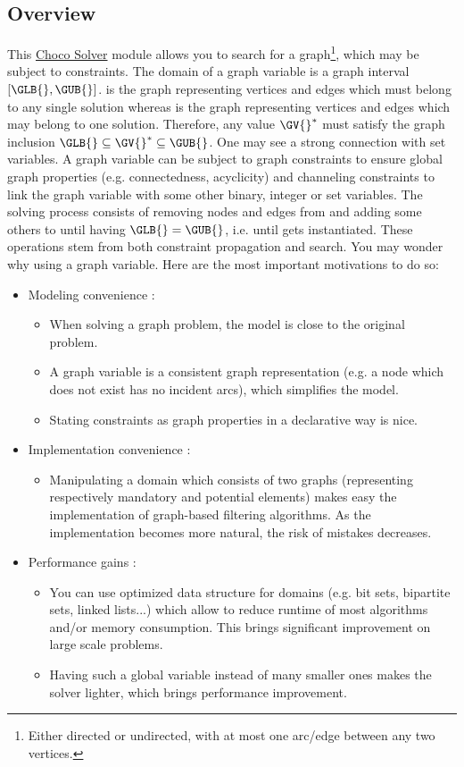 \documentclass{article}
\begin{document}
\subsection{Overview}

This \href{http://www.choco-solver.org/}{Choco Solver} module allows you to search for a graph\footnote{Either directed or undirected, with at most one arc/edge between any two vertices. }, which may be subject to constraints. 
%
The domain of a graph variable \GV{} is a graph interval $[\GLB{},\GUB{}]$. \GLB{} is the graph representing vertices and edges which must belong to any single solution whereas \GUB{} is the graph representing vertices and edges which may belong to one solution. Therefore, any value $\GV{}^*$ must satisfy the graph inclusion $\GLB{} \subseteq \GV{}^* \subseteq \GUB{}$. One may see a strong connection with set variables.
%
A graph variable can be subject to graph constraints to ensure global graph properties (e.g. connectedness, acyclicity) and channeling constraints to link the graph variable with some other binary, integer or set variables. 
%
The solving process consists of removing nodes and edges from \GUB{} and adding some others to \GLB{} until having $\GLB{} = \GUB{}$, i.e. until \GV{} gets instantiated. These operations stem from both constraint propagation and search. You may wonder why using a graph variable. Here are the most important motivations to do so:
\begin{itemize}
\item Modeling convenience : 
\begin{itemize}
\item When solving a graph problem, the model is close to the original problem. 
\item A graph variable is a consistent graph representation (e.g. a node which does not exist has no incident arcs), which simplifies the model. 
\item Stating constraints as graph properties in a declarative way is nice. 
\end{itemize}
\item Implementation convenience : 
\begin{itemize}
\item Manipulating a domain which consists of two graphs (representing respectively mandatory and potential elements) makes easy the implementation of graph-based filtering algorithms. As the implementation becomes more natural, the risk of mistakes decreases.
\end{itemize}
\item Performance gains : 
\begin{itemize}
\item You can use optimized data structure for domains (e.g. bit sets, bipartite sets, linked lists...) which allow to reduce runtime of most algorithms and/or memory consumption. This brings significant improvement on large scale problems. 
\item Having such a global variable instead of many smaller ones makes the solver lighter, which brings performance improvement.
\end{itemize}
\end{itemize}
\end{document}
